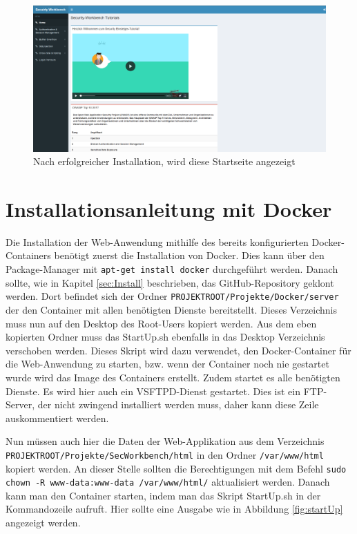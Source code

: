 \begin{figure}[H]
	\centering
	\includegraphics[width=\textwidth]{images/Installation/startseite.png}
	\caption{Nach erfolgreicher Installation, wird diese Startseite angezeigt}
	\label{fig:startseite}
\end{figure}

\section{Installationsanleitung mit Docker}
\label{sec:InstallWithDocker}

Die Installation der Web-Anwendung mithilfe des bereits konfigurierten Docker-Containers benötigt zuerst die Installation von Docker. Dies kann über den Package-Manager mit \colorbox{altgray}{\lstinline|apt-get install docker|} durchgeführt werden. Danach sollte, wie in Kapitel \ref{sec:Install} beschrieben, das GitHub-Repository geklont werden. Dort befindet sich der Ordner \colorbox{altgray}{\lstinline|PROJEKTROOT/Projekte/Docker/server |} der den Container mit allen benötigten Dienste bereitstellt. Dieses Verzeichnis muss nun auf den Desktop des Root-Users kopiert werden. Aus dem eben kopierten Ordner muss das StartUp.sh ebenfalls in das Desktop Verzeichnis verschoben werden. Dieses Skript wird dazu verwendet, den Docker-Container für die Web-Anwendung zu starten, bzw. wenn der Container noch nie gestartet wurde wird das Image des Containers erstellt. Zudem startet es alle benötigten Dienste. Es wird hier auch ein VSFTPD-Dienst gestartet. Dies ist ein FTP-Server, der nicht zwingend installiert werden muss, daher kann diese Zeile auskommentiert werden.\medskip

Nun müssen auch hier die Daten der Web-Applikation aus dem Verzeichnis \colorbox{altgray}{\lstinline|PROJEKTROOT/Projekte/SecWorkbench/html|} in den Ordner \colorbox{altgray}{\lstinline|/var/www/html|} kopiert werden. An dieser Stelle sollten die Berechtigungen mit dem Befehl \colorbox{altgray}{\lstinline|sudo chown -R www-data:www-data /var/www/html/|} aktualisiert werden. Danach kann man den Container starten, indem man das Skript StartUp.sh in der Kommandozeile aufruft. Hier sollte eine Ausgabe wie in Abbildung \ref{fig:startUp} angezeigt werden.

